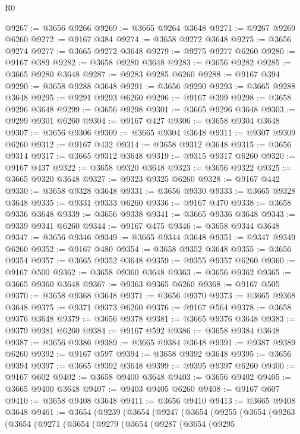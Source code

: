 \begin{lexlean}{R0}
\begin{coremodule}
@9267 := @3656 @9266
@9269 := @3665 @9264 @3648
@9271 := @9267 @9269 @6260
@9272 := @9167 @384
@9274 := @3658 @9272 @3648
@9275 := @3656 @9274
@9277 := @3665 @9272 @3648
@9279 := @9275 @9277 @6260
@9280 := @9167 @389
@9282 := @3658 @9280 @3648
@9283 := @3656 @9282
@9285 := @3665 @9280 @3648
@9287 := @9283 @9285 @6260
@9288 := @9167 @394
@9290 := @3658 @9288 @3648
@9291 := @3656 @9290
@9293 := @3665 @9288 @3648
@9295 := @9291 @9293 @6260
@9296 := @9167 @399
@9298 := @3658 @9296 @3648
@9299 := @3656 @9298
@9301 := @3665 @9296 @3648
@9303 := @9299 @9301 @6260
@9304 := @9167 @427
@9306 := @3658 @9304 @3648
@9307 := @3656 @9306
@9309 := @3665 @9304 @3648
@9311 := @9307 @9309 @6260
@9312 := @9167 @432
@9314 := @3658 @9312 @3648
@9315 := @3656 @9314
@9317 := @3665 @9312 @3648
@9319 := @9315 @9317 @6260
@9320 := @9167 @437
@9322 := @3658 @9320 @3648
@9323 := @3656 @9322
@9325 := @3665 @9320 @3648
@9327 := @9323 @9325 @6260
@9328 := @9167 @442
@9330 := @3658 @9328 @3648
@9331 := @3656 @9330
@9333 := @3665 @9328 @3648
@9335 := @9331 @9333 @6260
@9336 := @9167 @470
@9338 := @3658 @9336 @3648
@9339 := @3656 @9338
@9341 := @3665 @9336 @3648
@9343 := @9339 @9341 @6260
@9344 := @9167 @475
@9346 := @3658 @9344 @3648
@9347 := @3656 @9346
@9349 := @3665 @9344 @3648
@9351 := @9347 @9349 @6260
@9352 := @9167 @480
@9354 := @3658 @9352 @3648
@9355 := @3656 @9354
@9357 := @3665 @9352 @3648
@9359 := @9355 @9357 @6260
@9360 := @9167 @500
@9362 := @3658 @9360 @3648
@9363 := @3656 @9362
@9365 := @3665 @9360 @3648
@9367 := @9363 @9365 @6260
@9368 := @9167 @505
@9370 := @3658 @9368 @3648
@9371 := @3656 @9370
@9373 := @3665 @9368 @3648
@9375 := @9371 @9373 @6260
@9376 := @9167 @564
@9378 := @3658 @9376 @3648
@9379 := @3656 @9378
@9381 := @3665 @9376 @3648
@9383 := @9379 @9381 @6260
@9384 := @9167 @592
@9386 := @3658 @9384 @3648
@9387 := @3656 @9386
@9389 := @3665 @9384 @3648
@9391 := @9387 @9389 @6260
@9392 := @9167 @597
@9394 := @3658 @9392 @3648
@9395 := @3656 @9394
@9397 := @3665 @9392 @3648
@9399 := @9395 @9397 @6260
@9400 := @9167 @602
@9402 := @3658 @9400 @3648
@9403 := @3656 @9402
@9405 := @3665 @9400 @3648
@9407 := @9403 @9405 @6260
@9408 := @9167 @607
@9410 := @3658 @9408 @3648
@9411 := @3656 @9410
@9413 := @3665 @9408 @3648
@9461 := @3654
    (@9239
      (@3654
        (@9247
          (@3654
            (@9255
              (@3654
                (@9263
                  (@3654
                    (@9271
                      (@3654
                        (@9279
                          (@3654
                            (@9287
                              (@3654
                                (@9295

\end{coremodule}
\end{lexlean}
